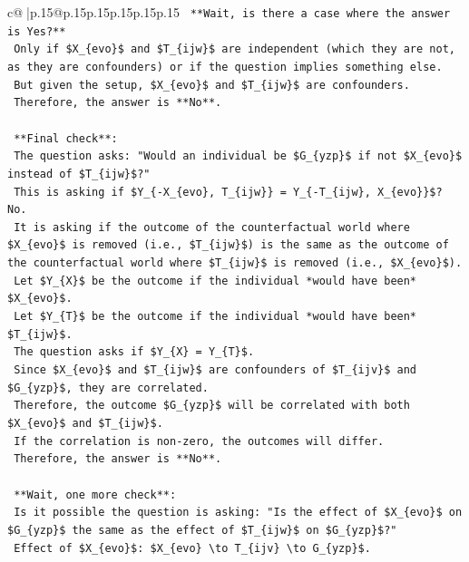 \documentclass{article}
\begin{document}
{\begin{supertabular}{c@{$\;$}|p{.15\linewidth}@{}p{.15\linewidth}p{.15\linewidth}p{.15\linewidth}p{.15\linewidth}p{.15\linewidth}}
{{{\texttt{    **Wait, is there a case where the answer is Yes?**} \\
\texttt{    Only if \$X\_\{evo\}\$ and \$T\_\{ijw\}\$ are independent (which they are not, as they are confounders) or if the question implies something else.} \\
\texttt{    But given the setup, \$X\_\{evo\}\$ and \$T\_\{ijw\}\$ are confounders.} \\
\texttt{    Therefore, the answer is **No**.} \\
\\ 
\texttt{    **Final check**:} \\
\texttt{    The question asks: "Would an individual be \$G\_\{yzp\}\$ if not \$X\_\{evo\}\$ instead of \$T\_\{ijw\}\$?"} \\
\texttt{    This is asking if \$Y\_\{{-}X\_\{evo\}, T\_\{ijw\}\} = Y\_\{{-}T\_\{ijw\}, X\_\{evo\}\}\$? No.} \\
\texttt{    It is asking if the outcome of the counterfactual world where \$X\_\{evo\}\$ is removed (i.e., \$T\_\{ijw\}\$) is the same as the outcome of the counterfactual world where \$T\_\{ijw\}\$ is removed (i.e., \$X\_\{evo\}\$).} \\
\texttt{    Let \$Y\_\{X\}\$ be the outcome if the individual *would have been* \$X\_\{evo\}\$.} \\
\texttt{    Let \$Y\_\{T\}\$ be the outcome if the individual *would have been* \$T\_\{ijw\}\$.} \\
\texttt{    The question asks if \$Y\_\{X\} = Y\_\{T\}\$.} \\
\texttt{    Since \$X\_\{evo\}\$ and \$T\_\{ijw\}\$ are confounders of \$T\_\{ijv\}\$ and \$G\_\{yzp\}\$, they are correlated.} \\
\texttt{    Therefore, the outcome \$G\_\{yzp\}\$ will be correlated with both \$X\_\{evo\}\$ and \$T\_\{ijw\}\$.} \\
\texttt{    If the correlation is non{-}zero, the outcomes will differ.} \\
\texttt{    Therefore, the answer is **No**.} \\
\\ 
\texttt{    **Wait, one more check**:} \\
\texttt{    Is it possible the question is asking: "Is the effect of \$X\_\{evo\}\$ on \$G\_\{yzp\}\$ the same as the effect of \$T\_\{ijw\}\$ on \$G\_\{yzp\}\$?"} \\
\texttt{    Effect of \$X\_\{evo\}\$: \$X\_\{evo\} \textbackslash{}to T\_\{ijv\} \textbackslash{}to G\_\{yzp\}\$.} \\
}}}
\end{supertabular}}
\end{document}
